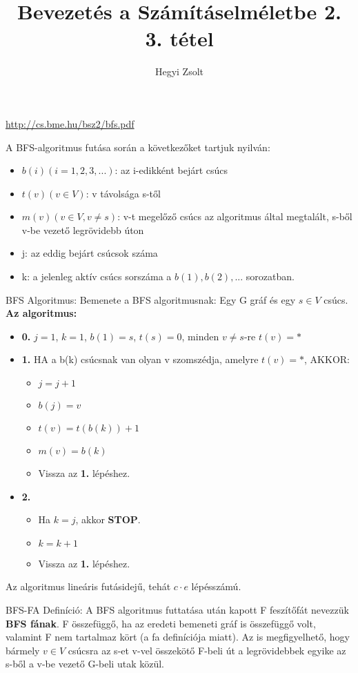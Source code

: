 \documentclass[]{article}
\title{Bevezetés a Számításelméletbe 2.\\{\large 3. tétel}}
\author{Hegyi Zsolt}
\begin{document}
\maketitle{}
\url{http://cs.bme.hu/bsz2/bfs.pdf}
\begin{framed}
A BFS-algoritmus futása során a következőket tartjuk nyilván:
\begin{itemize}
\item $b(i) (i = 1,2,3,...)$: az i-edikként bejárt csúcs
\item $t(v) (v \in V)$: v távolsága s-től
\item $m(v) (v \in V, v \neq s)$: v-t megelőző csúcs az algoritmus által megtalált, s-ből v-be vezető legrövidebb úton
\item j: az eddig bejárt csúcsok száma
\item k: a jelenleg aktív csúcs sorszáma a $b(1), b(2),...$ sorozatban.
\end{itemize}
\end{framed}
\begin{framed}
BFS Algoritmus:
Bemenete a BFS algoritmusnak: Egy G gráf és egy $s \in V$ csúcs.
\\
\textbf{Az algoritmus:}
\begin{itemize}
\item{\textbf{0.}} $j = 1$, $k = 1$, $b(1) = s$, $t(s) = 0$, minden $v \neq s$-re $t(v) = *$
\item{\textbf{1.}} HA a b(k) csúcsnak van olyan v szomszédja, amelyre $t(v) = *$, AKKOR:
	\begin{itemize}
	\item $j = j + 1$
	\item $b(j) = v$
	\item $t(v) = t(b(k)) + 1$
	\item $m(v) = b(k)$
	\item Vissza az \textbf{1.} lépéshez.
	\end{itemize}
\item{\textbf{2.}}
	\begin{itemize}
	\item Ha $k = j$, akkor \textbf{STOP}.
	\item $k = k + 1$
	\item Vissza az \textbf{1.} lépéshez.
	\end{itemize}
\end{itemize}
Az algoritmus lineáris futásidejű, tehát $c \cdot e$ lépésszámú.
\end{framed}
\begin{shaded}
BFS-FA Definíció: A BFS algoritmus futtatása után kapott F feszítőfát nevezzük \textbf{BFS fának}. F összefüggő, ha az eredeti bemeneti gráf is összefüggő volt, valamint F nem tartalmaz kört (a fa definíciója miatt). Az is megfigyelhető, hogy bármely $v \in V$ csúcsra az s-et v-vel összekötő F-beli út a legrövidebbek egyike az s-ből a v-be vezető G-beli utak közül.
\end{shaded}
\end{document}
